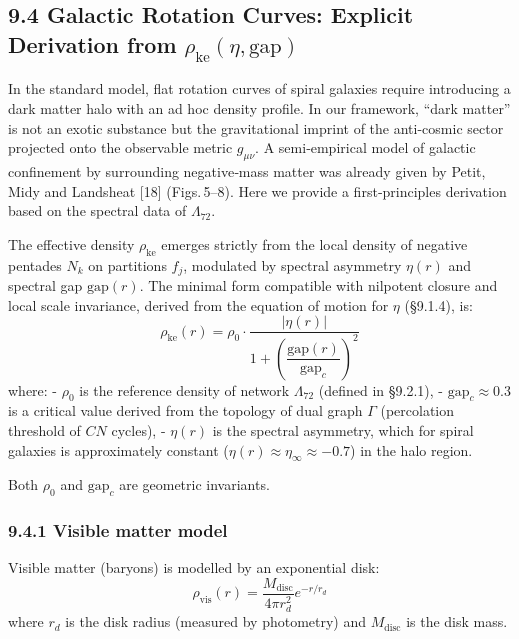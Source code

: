 \documentclass[11pt]{article}
\begin{document}
\hypertarget{galactic-rotation-curves-explicit-derivation-from-rho_textkeeta-textgap}{%
\subsection{\texorpdfstring{9.4 Galactic Rotation Curves: Explicit
Derivation from
\(\rho_{\text{ke}}(\eta, \text{gap})\)}{9.4 Galactic Rotation Curves: Explicit Derivation from \textbackslash rho\_\{\textbackslash text\{ke\}\}(\textbackslash eta, \textbackslash text\{gap\})}}\label{galactic-rotation-curves-explicit-derivation-from-rho_textkeeta-textgap}}

In the standard model, flat rotation curves of spiral galaxies require
introducing a dark matter halo with an ad hoc density profile. In our
framework, ``dark matter'' is not an exotic substance but the
gravitational imprint of the anti-cosmic sector projected onto the
observable metric \(g_{\mu\nu}\). A semi‑empirical model of galactic
confinement by surrounding negative‑mass matter was already given by
Petit, Midy and Landsheat {[}18{]} (Figs.\,5--8). Here we provide a
first‑principles derivation based on the spectral data of
\(\Lambda_{72}\).

The effective density \(\rho_{\text{ke}}\) emerges strictly from the
local density of negative pentades \(N_k\) on partitions \(f_j\),
modulated by spectral asymmetry \(\eta(r)\) and spectral gap
\(\text{gap}(r)\). The minimal form compatible with nilpotent closure
and local scale invariance, derived from the equation of motion for
\(\eta\) (§9.1.4), is: \[
\rho_{\text{ke}}(r) = \rho_0 \cdot \frac{|\eta(r)|}{1 + \left( \dfrac{\text{gap}(r)}{\text{gap}_c} \right)^2}
\] where: - \(\rho_0\) is the reference density of network
\(\Lambda_{72}\) (defined in §9.2.1), - \(\text{gap}_c \approx 0.3\) is
a critical value derived from the topology of dual graph \(\Gamma\)
(percolation threshold of \(CN\) cycles), - \(\eta(r)\) is the spectral
asymmetry, which for spiral galaxies is approximately constant
(\(\eta(r) \approx \eta_\infty \approx -0.7\)) in the halo region.

Both \(\rho_0\) and \(\text{gap}_c\) are geometric invariants.

\hypertarget{visible-matter-model}{%
\subsubsection{9.4.1 Visible matter model}\label{visible-matter-model}}

Visible matter (baryons) is modelled by an exponential disk: \[
\rho_{\text{vis}}(r) = \frac{M_{\text{disc}}}{4\pi r_d^2} e^{-r/r_d}
\] where \(r_d\) is the disk radius (measured by photometry) and
\(M_{\text{disc}}\) is the disk mass.
\end{document}
